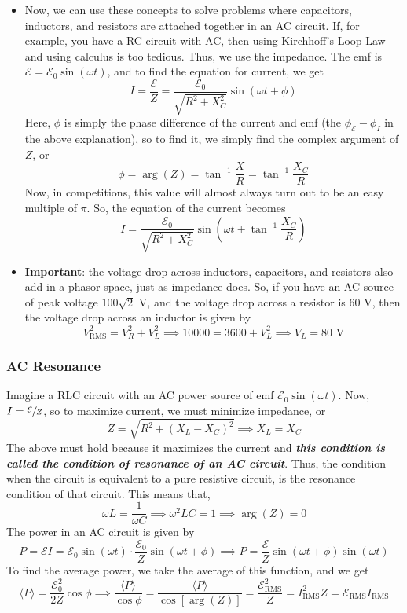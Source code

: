 \documentclass{scrartcl}
\begin{document}
    \begin{itemize}
        \item Now, we can use these concepts to solve problems where capacitors, inductors, and resistors are attached together in an AC circuit. If, for example, you have a RC circuit with AC, then using Kirchhoff's Loop Law and using calculus is too tedious. Thus, we use the impedance. The emf is $\mathcal E=\mathcal E_0\sin\left(\omega t\right)$, and to find the equation for current, we get \[I=\frac{\mathcal E}Z=\frac{\mathcal E_0}{\sqrt{R^2+X_C^2}}\sin\left(\omega t+\phi\right)\] Here, $\phi$ is simply the phase difference of the current and emf (the $\phi_\mathcal{E}-\phi_I$ in the above explanation), so to find it, we simply find the complex argument of $Z$, or \[\phi=\boxed{\arg\left(Z\right)=\tan^{-1}\frac XR}=\tan^{-1}\frac{X_C}R\] Now, in competitions, this value will almost always turn out to be an easy multiple of $\pi$. So, the equation of the current becomes \[\boxed{I=\frac{\mathcal E_0}{\sqrt{R^2+X_C^2}}\sin\left(\omega t+\tan^{-1}\frac{X_C}R\right)}\]
        \item \textbf{Important}: the voltage drop across inductors, capacitors, and resistors also add in a phasor space, just as impedance does. So, if you have an AC source of peak voltage $100\sqrt2$ V, and the voltage drop across a resistor is 60 V, then the voltage drop across an inductor is given by \[V_\text{RMS}^2=V_R^2+V_L^2\implies10000=3600+V_L^2\implies V_L=80\text{ V}\]
    \end{itemize}
    \subsubsection{AC Resonance}
    \newline\quad Imagine a RLC circuit with an AC power source of emf $\mathcal E_0\sin\left(\omega t\right)$. Now, $I=\sfrac{\mathcal E}Z$, so to maximize current, we must minimize impedance, or \[Z=\sqrt{R^2+\left(X_L-X_C\right)^2}\implies\boxed{X_L=X_C}\] The above must hold because it maximizes the current and \textit{\textbf{this condition is called the condition of resonance of an AC circuit}}. Thus, the condition when the circuit is equivalent to a pure resistive circuit, is the resonance condition of that circuit. This means that, \[\omega L=\frac1{\omega C}\implies\boxed{\omega^2LC=1}\implies\arg\left(Z\right)=0\]
    \newline\quad The power in an AC circuit is given by \[P=\mathcal EI=\mathcal E_0\sin\left(\omega t\right)\cdot\frac{\mathcal E_0}Z\sin\left(\omega t+\phi\right)\implies\boxed{P=\frac{\mathcal E}Z\sin\left(\omega t+\phi\right)\sin\left(\omega t\right)}\] To find the average power, we take the average of this function, and we get \[\langle P\rangle=\frac{\mathcal E_0^2}{2Z}\cos\phi\implies\frac{\langle P\rangle}{\cos\phi}=\boxed{\frac{\langle P\rangle}{\cos\left[\arg\left(Z\right)\right]}=\frac{\mathcal E_\text{RMS}^2}Z=I_\text{RMS}^2Z=\mathcal E_\text{RMS}I_\text{RMS}}\]
\end{document}

